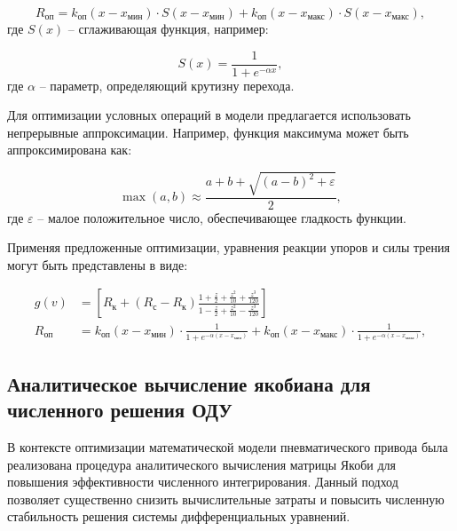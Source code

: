 \begin{equation*}
    R_\text{оп} = k_\text{оп}(x - x_\text{мин})\cdot S(x - x_\text{мин}) + k_\text{оп}(x - x_\text{макс})\cdot S(x - x_\text{макс}),
\end{equation*}
где $S(x)$ -- сглаживающая функция, например:

\begin{equation*}
    S(x) = \frac{1}{1 + e^{-\alpha x}},
\end{equation*}
где $\alpha$ -- параметр, определяющий крутизну перехода.

Для оптимизации условных операций в модели предлагается
использовать непрерывные аппроксимации. Например, функция
максимума может быть аппроксимирована как:

\begin{equation*}
    \max(a, b) \approx \frac{a + b + \sqrt{(a - b)^2 + \varepsilon}}{2},
\end{equation*}
где $\varepsilon$ -- малое положительное число, обеспечивающее гладкость функции.

Применяя предложенные оптимизации, уравнения реакции упоров и силы трения могут быть представлены в виде:

\begin{equation}
    \begin{alignedat}{2}
        g(v) & = \left[R_\text{к} + (R_\text{с} - R_\text{к})\frac{1 + \frac{z}{2} + \frac{z^2}{10} + \frac{z^3}{120}}{1 - \frac{z}{2} + \frac{z^2}{10} - \frac{z^3}{120}}\right] \\
        R_\text{оп} & = k_\text{оп}(x - x_\text{мин})\cdot \frac{1}{1 + e^{-\alpha(x - x_\text{мин})}} + k_\text{оп}(x - x_\text{макс})\cdot \frac{1}{1 + e^{-\alpha(x - x_\text{макс})}},
    \end{alignedat}
\end{equation}

\subsection{Аналитическое вычисление якобиана для численного решения ОДУ}\label{sec:ch2/sec5/subsec3}

В контексте оптимизации математической модели пневматического привода была реализована процедура аналитического
вычисления матрицы Якоби для повышения эффективности численного интегрирования. Данный подход позволяет
существенно снизить вычислительные затраты и повысить численную стабильность решения системы дифференциальных уравнений.

